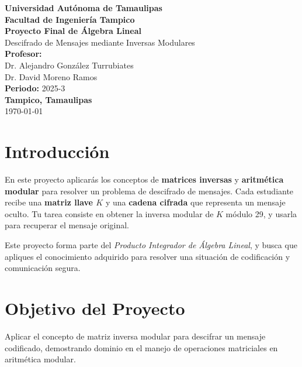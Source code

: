 \documentclass[12pt]{article}
\begin{document}
\begin{titlepage}
    \begin{center}
        {\Large \textbf{Universidad Autónoma de Tamaulipas}}\\[0.3cm]
        {\large \textbf{Facultad de Ingeniería Tampico}}\\[2cm]
        {\LARGE \textbf{Proyecto Final de Álgebra Lineal}}\\[0.5cm]
        {\Large Descifrado de Mensajes mediante Inversas Modulares}\\[2cm]
        \textbf{Profesor:}\\ 
        Dr. Alejandro González Turrubiates\\[0.5cm]
        Dr. David Moreno Ramos\\[0.5cm]
        \textbf{Periodo:} 2025-3\\[0.5cm]
        \vfill
        \textbf{Tampico, Tamaulipas}\\[0.2cm]
        \today
    \end{center}
\end{titlepage}

\section*{Introducción}
En este proyecto aplicarás los conceptos de \textbf{matrices inversas} y \textbf{aritmética modular}
para resolver un problema de descifrado de mensajes. Cada estudiante recibe una
\textbf{matriz llave $K$} y una \textbf{cadena cifrada} que representa un mensaje oculto.
Tu tarea consiste en obtener la inversa modular de $K$ módulo 29, y usarla para recuperar el mensaje original.

Este proyecto forma parte del \textit{Producto Integrador de Álgebra Lineal},
y busca que apliques el conocimiento adquirido para resolver una situación de codificación y comunicación segura.

\section*{Objetivo del Proyecto}
Aplicar el concepto de matriz inversa modular para descifrar un mensaje codificado,
demostrando dominio en el manejo de operaciones matriciales en aritmética modular.

\end{document}
